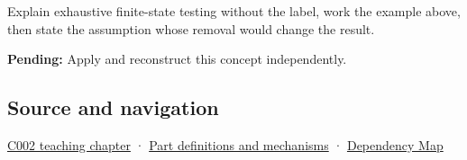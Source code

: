 Explain exhaustive finite-state testing without the label, work the example above, then state the assumption whose removal would change the result.

\textbf{Pending:} Apply and reconstruct this concept independently.

\subsection{Source and navigation}\label{appendix-05db24ccc28a-source-and-navigation}

\hyperref[01-foundations-i-ch001-arithmetic-becomes-a-policy]{C002 teaching chapter} · \hyperref[appendix-fd090d982a15]{Part definitions and mechanisms} · \hyperref[appendix-4ad47bdd269a]{Dependency Map}
